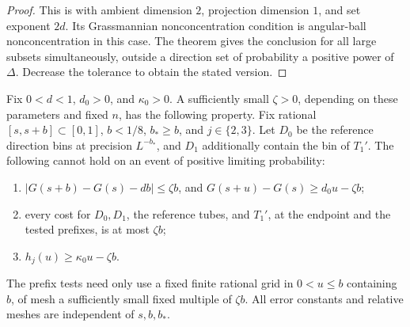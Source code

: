 \begin{proof}
This is \citet[Theorem~1]{He2020} with ambient dimension $2$,
projection dimension $1$, and set exponent $2d$.  Its Grassmannian
nonconcentration condition is angular-ball nonconcentration in this
case.  The theorem gives the conclusion for all large subsets
simultaneously, outside a direction set of probability a positive power
of $\Delta$.  Decrease the tolerance to obtain the stated version.
\end{proof}

\begin{lemma}\label{t:block-test}
Fix $0<d<1$, $d_0>0$, and $\kappa_0>0$.  A sufficiently small
$\zeta>0$, depending on these parameters and fixed $n$, has the
following property.  Fix rational $[s,s+b]\subset[0,1]$, $b<1/8$,
$b_*\ge b$, and $j\in\{2,3\}$.  Let $D_0$ be the reference direction
bins at precision $L^{-b_*}$, and $D_1$ additionally contain the bin
of $T_1'$.  The following cannot hold on an event of positive limiting
probability:
\begin{enumerate}[label=\textnormal{(\roman*)}]
\item $|G(s+b)-G(s)-db|\le\zeta b$, and
      $G(s+u)-G(s)\ge d_0u-\zeta b$;
\item every cost for $D_0,D_1$, the reference tubes, and $T_1'$, at the
      endpoint and the tested prefixes, is at most $\zeta b$;
\item $h_j(u)\ge\kappa_0u-\zeta b$.
\end{enumerate}
The prefix tests need only use a fixed finite rational grid in $0<u\le b$
containing $b$, of mesh a sufficiently small fixed multiple of $\zeta b$.
All error constants and relative meshes are independent of $s,b,b_*$.
\end{lemma}

